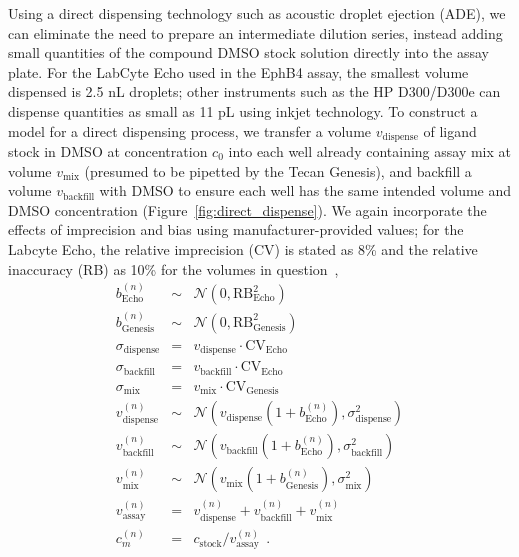 \documentclass[aps,pre,twocolumn,nofootinbib,superscriptaddress,linenumbers]{revtex4-1}
\begin{document}
Using a direct dispensing technology such as acoustic droplet ejection (ADE), we can eliminate the need to prepare an intermediate dilution series, instead adding small quantities of the compound DMSO stock solution directly into the assay plate.
For the LabCyte Echo used in the EphB4 assay, the smallest volume dispensed is 2.5 nL droplets; other instruments such as the HP D300/D300e can dispense quantities as small as 11 pL using inkjet technology.
To construct a model for a direct dispensing process, we transfer a volume $v_\mathrm{dispense}$ of ligand stock in DMSO at concentration $c_0$ into each well already containing assay mix at volume $v_\mathrm{mix}$ (presumed to be pipetted by the Tecan Genesis), and backfill a volume $v_\mathrm{backfill}$ with DMSO to ensure each well has the same intended volume and DMSO concentration (Figure~\ref{fig:direct_dispense}). 
We again incorporate the effects of imprecision and bias using manufacturer-provided values;
for the Labcyte Echo, the relative imprecision (CV) is stated as 8\% and the relative inaccuracy (RB) as 10\% for the volumes in question~\cite{_echo_2011},
\begin{eqnarray}
b_\mathrm{Echo}^{(n)} &\sim& \mathcal{N}(0, \mathrm{RB}_\mathrm{Echo}^2) \nonumber \\
b_\mathrm{Genesis}^{(n)} &\sim& \mathcal{N}(0, \mathrm{RB}_\mathrm{Genesis}^2) \nonumber \\
\sigma_\mathrm{dispense} &=& v_\mathrm{dispense} \cdot \mathrm{CV}_\mathrm{Echo} \nonumber \\
\sigma_\mathrm{backfill} &=& v_\mathrm{backfill} \cdot \mathrm{CV}_\mathrm{Echo} \nonumber \\
\sigma_\mathrm{mix} &=& v_\mathrm{mix} \cdot \mathrm{CV}_\mathrm{Genesis} \nonumber \\
v_\mathrm{dispense}^{(n)} &\sim& \mathcal{N}(v_\mathrm{dispense} (1 + b_\mathrm{Echo}^{(n)}) , \sigma_\mathrm{dispense}^2) \nonumber \\
v_\mathrm{backfill}^{(n)} &\sim& \mathcal{N}(v_\mathrm{backfill} (1 + b_\mathrm{Echo}^{(n)}), \sigma_\mathrm{backfill}^2) \nonumber \\
v_\mathrm{mix}^{(n)} &\sim& \mathcal{N}(v_\mathrm{mix} (1 + b_\mathrm{Genesis}^{(n)}), \sigma_\mathrm{mix}^2) \nonumber \\
v_\mathrm{assay}^{(n)} &=& v_\mathrm{dispense}^{(n)} + v_\mathrm{backfill}^{(n)} + v_\mathrm{mix}^{(n)} \nonumber \\
c_m^{(n)} &=& c_\mathrm{stock} / v_\mathrm{assay}^{(n)} \:\: . \label{equation:stock-concentration-uncertainty-simple}
\end{eqnarray}
\end{document}
